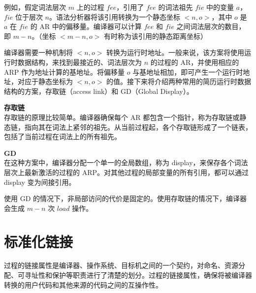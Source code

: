 \documentclass[12pt]{article}
\begin{document}
例如，假定词法层次 $m$ 上的过程 $fee$，引用了 $fee$ 的词法祖先 $fie$ 中的变量 $a$，$fie$ 位于层次 $n$。语法分析器将该引用转换为一个静态坐标 $<n, o>$，其中 $o$ 是 $a$ 在 $fie$ 的 AR 中的偏移量。编译器可以计算 $fee$ 和 $fie$ 之间词法层次的数目，即 $m-n$。（坐标 $<m-n, o>$ 有时称为该引用的静态距离坐标）

编译器需要一种机制将 $<n, o>$ 转换为运行时地址。一般来说，该方案将使用运行时数据结构，来找到最接近的、词法层次为 $n$ 的过程的 AR，并使用相应的 ARP 作为地址计算的基地址。将偏移量 $o$ 与基地址相加，即可产生一个运行时地址，对应于静态坐标为 $<n,  o>$ 的值。接下来将介绍两种常用的简历运行时数据结构的方案，存取链（access link）和 GD（Global Display）。

\textbf{存取链}\\
存取链的原理比较简单。编译器确保每个 AR 都包含一个指针，称为存取链或静态链，指向其在词法上紧邻的祖先。从当前过程起，各个存取链形成了一个链表，包括了当前过程在词法上的所有祖先。

\textbf{GD}\\
在这种方案中，编译器分配一个单一的全局数组，称为 display，来保存各个词法层次上最新激活的过程的 ARP。对其他过程的局部变量的所有引用，都可以通过 display 变为间接引用。

使用  GD 的情况下，非局部访问的代价是固定的。使用存取链的情况下，编译器会生成 $m-n$ 次 $load$ 操作。


\section*{标准化链接}

过程的链接属性是编译器、操作系统、目标机之间的一个契约，对命名、资源分配、可寻址性和保护等职责进行了清楚的划分。过程的链接属性，确保将被编译器转换的用户代码和其他来源的代码之间的互操作性。
\end{document}
